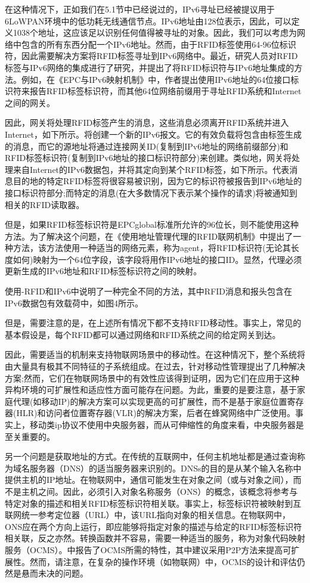 \documentclass[12pt,a4paper]{article}%
\begin{document}
在这种情况下，正如我们在5.1节中已经说过的，IPv6寻址已经被提议用于6LoWPAN环境中的低功耗无线通信节点。IPv6地址由128位表示，因此，可以定义1038个地址，这应该足以识别任何值得被寻址的对象。因此，我们可以考虑为网络中包含的所有东西分配一个IPv6地址。然而，由于RFID标签使用64-96位标识符，因此需要解决方案将RFID标签寻址到IPv6网络中。最近，研究人员对RFID标签与IPv6网络的集成进行了研究，并提出了将RFID标识符与IPv6地址集成的方法。例如，在《EPC与IPv6映射机制》中，作者提出使用IPv6地址的64位接口标识符来报告RFID标签标识符，而其他64位网络前缀用于寻址RFID系统和Internet之间的网关。

因此，网关将处理RFID标签产生的消息，这些消息必须离开RFID系统并进入Internet，如下所示。将创建一个新的IPv6报文。它的有效负载将包含由标签生成的消息，而它的源地址将通过连接网关ID(复制到IPv6地址的网络前缀部分)和RFID标签标识符(复制到IPv6地址的接口标识符部分)来创建。类似地，网关将处理来自Internet的IPv6数据包，并将其定向到某个RFID标签，如下所示。代表消息目的地的特定RFID标签将很容易被识别，因为它的标识符被报告到IPv6地址的接口标识符部分;而特定的消息(在大多数情况下表示某个操作的请求)将被通知到相关的RFID读取器。

但是，如果RFID标签标识符是EPCglobal标准所允许的96位长，则不能使用这种方法。为了解决这个问题，在《使用地址管理代理的RFID联网机制》中提出了一种方法，该方法使用一种适当的网络元素，称为agent，将RFID标识符(无论其长度如何)映射为一个64位字段，该字段将用作IPv6地址的接口ID。显然，代理必须更新生成的IPv6地址和RFID标签标识符之间的映射。

使用-RFID和IPv6中说明了一种完全不同的方法，其中RFID消息和报头包含在IPv6数据包有效载荷中，如图4所示。

但是，需要注意的是，在上述所有情况下都不支持RFID移动性。事实上，常见的基本假设是，每个RFID都可以通过网络和RFID系统之间的给定网关到达。

因此，需要适当的机制来支持物联网场景中的移动性。在这种情况下，整个系统将由大量具有极其不同特征的子系统组成。在过去，针对移动性管理提出了几种解决方案;然而，它们在物联网场景中的有效性应该得到证明，因为它们在应用于这种异构环境的可扩展性和适应性方面可能存在问题。为此，重要的是要注意，基于家庭代理(如移动IP)的解决方案可以实现更高的可扩展性，而不是基于家庭位置寄存器(HLR)和访问者位置寄存器(VLR)的解决方案，后者在蜂窝网络中广泛使用。事实上，移动类ip协议不使用中央服务器，而从可伸缩性的角度来看，中央服务器是至关重要的。

另一个问题是获取地址的方式。在传统的互联网中，任何主机地址都是通过查询称为域名服务器（DNS）的适当服务器来识别的。DNSs的目的是从某个输入名称中提供主机的IP地址。在物联网中，通信可能发生在对象之间（或与对象之间），而不是主机之间。因此，必须引入对象名称服务（ONS）的概念，该概念将参考与特定对象的描述和相关RFID标签标识符相关联。事实上，标签标识符被映射到互联网统一参考定位器（URL）中，该URL指向对象的相关信息。在物联网中，ONS应在两个方向上运行，即应能够将指定对象的描述与给定的RFID标签标识符相关联，反之亦然。转换函数并不容易，需要一种适当的服务，称为对象代码映射服务（OCMS）。中报告了OCMS所需的特性，其中建议采用P2P方法来提高可扩展性。然而，请注意，在复杂的操作环境（如物联网）中，OCMS的设计和评估仍然是悬而未决的问题。
\end{document}
